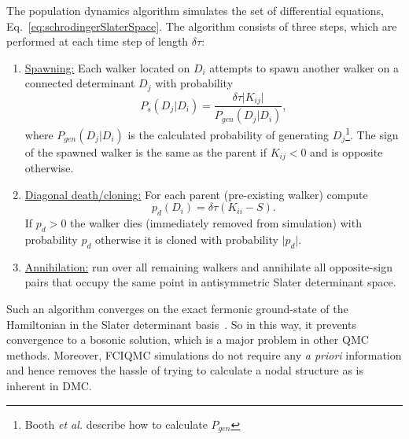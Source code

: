 The population dynamics algorithm \cite{Booth2009,Booth2010,Booth2011} simulates the set of differential equations, Eq.~\ref{eq:schrodingerSlaterSpace}. The algorithm consists of three steps, which are performed at each time step of length $\delta\tau$:
\begin{enumerate}
\item \underline{Spawning:}  Each walker located on $D_i$ attempts to spawn another walker on a connected determinant $D_j$ with probability 
\begin{equation}
P_s(D_j\vert D_i) = \frac{\delta \tau \lvert K_{ij} \rvert}{P_{gen}(D_j\vert D_i)},
\end{equation}
where $P_{gen}(D_j\vert D_i)$ is the calculated probability of generating $D_j$\footnote{Booth \textit{et al.}\cite{Booth2009} describe how to calculate $P_{gen}$}. The sign of the spawned walker is the same as the parent if $K_{ij}<0$ and is opposite otherwise.
\item \underline{Diagonal death/cloning:} For each parent (pre-existing walker) compute
\begin{equation}
p_d(D_i) = \delta\tau(K_{ii}-S).
\end{equation}
If $p_d > 0$ the walker dies (immediately removed from simulation) with probability $p_d$ otherwise it is cloned with probability $\lvert p_d \rvert$.
\item \underline{Annihilation:} run over all remaining walkers and annihilate all opposite-sign pairs that occupy the same point in antisymmetric Slater determinant space.
\end{enumerate}
Such an algorithm converges on the exact fermonic ground-state of the Hamiltonian in the Slater determinant basis~\cite{Booth2009}. So in this way, it prevents convergence to a bosonic solution, which is a major problem in other QMC methods. Moreover, FCIQMC simulations do not require any \emph{a priori} information and hence removes the hassle of trying to calculate a nodal structure as is inherent in DMC. 


